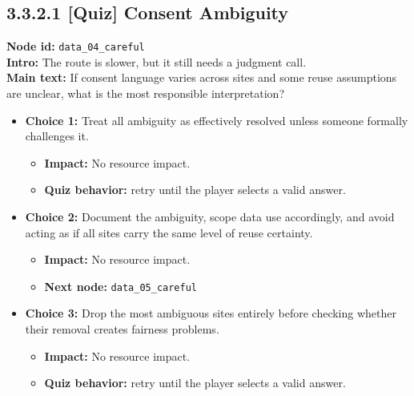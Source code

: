 \documentclass[11pt]{article}
\begin{document}
\subsection*{3.3.2.1 [Quiz] Consent Ambiguity}
\textbf{Node id:} \texttt{data\_04\_careful}\\
\textbf{Intro:} The route is slower, but it still needs a judgment call.\\
\textbf{Main text:} If consent language varies across sites and some reuse assumptions are unclear, what is the most responsible interpretation?\\
\begin{itemize}
\item \textbf{Choice 1:} Treat all ambiguity as effectively resolved unless someone formally challenges it.
\begin{itemize}
\item \textbf{Impact:} No resource impact.
\item \textbf{Quiz behavior:} retry until the player selects a valid answer.
\end{itemize}
\item \textbf{Choice 2:} Document the ambiguity, scope data use accordingly, and avoid acting as if all sites carry the same level of reuse certainty.
\begin{itemize}
\item \textbf{Impact:} No resource impact.
\item \textbf{Next node:} \texttt{data\_05\_careful}
\end{itemize}
\item \textbf{Choice 3:} Drop the most ambiguous sites entirely before checking whether their removal creates fairness problems.
\begin{itemize}
\item \textbf{Impact:} No resource impact.
\item \textbf{Quiz behavior:} retry until the player selects a valid answer.
\end{itemize}
\end{itemize}
\end{document}
